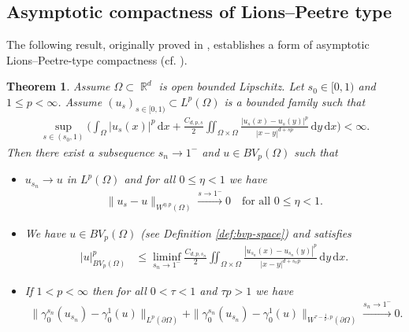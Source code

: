 \documentclass[12pt, reqno]{amsart}%
\theoremstyle{plain}  %
\newtheorem{theorem}{Theorem}[section]
\theoremstyle{definition}  %
\theoremstyle{remark}
\numberwithin{equation}{section}
\DeclareMathOperator{\R}{\mathbb{R}}
\renewcommand{\d}{\,\mathrm{d}}
\begin{document}
\subsection{Asymptotic compactness of Lions--Peetre type}
The following result, originally proved in \cite[Corollary~7]{BBM01}, establishes a form of asymptotic Lions--Peetre-type compactness (cf. \cite[Theorems~V.2.1 and~V.2.2]{LiPe64}). 
\begin{theorem}\label{thm:asymp-compact-frac}
Assume $\Omega \subset \R^d$ is open bounded Lipschitz. Let $s_0 \in [0,1)$ and $1\leq p<\infty$. Assume $(u_s)_{s\in[0,1)} \subset L^p(\Omega)$ is a bounded family such that
\begin{align*}
\sup_{s\in(s_0,1)}
\Big(\int_\Omega |u_s(x)|^p\d x+ \frac{C_{d,p,s}}{2}
\iint_{\Omega \times \Omega} \frac{|u_s(x)-u_s(y)|^p}{|x-y|^{d+sp}} \d y\d x\Big)<\infty.
\end{align*}
 Then there exist a subsequence $s_n\to 1^-$ and $u \in BV_p(\Omega)$ such that
\begin{itemize}
\item $u_{s_n}\to u$ in $L^p(\Omega)$ and  for all $0\leq \eta<1$ we have
\begin{align*}
\|u_s-u\|_{W^{\eta,p}(\Omega)}
\xrightarrow{s\to 1^-}0\quad \text{for all $0\leq \eta<1$}.
\end{align*}
\item  %
We have $u\in BV_p(\Omega)$ (see Definition \ref{def:bvp-space}) and satisfies
\begin{align*}
|u|^p_{BV_p(\Omega)}
&\leq \liminf_{s_n\to 1^-} \frac{C_{d,p,s_n}}{2}
\iint_{\Omega \times \Omega} \frac{|u_{s_n}(x)-u_{s_n}(y)|^p}{|x-y|^{d+s_np}} \d y\d x.
\end{align*}
\item If $1<p<\infty$ then for all $0< \tau <1$ and $\tau p>1$ we have
\begin{align*}
\|\gamma^{s_n}_0(u_{s_n})-\gamma^1_0(u)\|_{L^{p}(\partial \Omega)}+ \|\gamma_0^{s_n} (u_{s_n})-\gamma^1_0(u)\|_{W^{\tau-\frac{1}{p},p}(\partial \Omega)}
\xrightarrow{s_n\to 1^-}0.
\end{align*}
\end{itemize}
\end{theorem}
\end{document}
